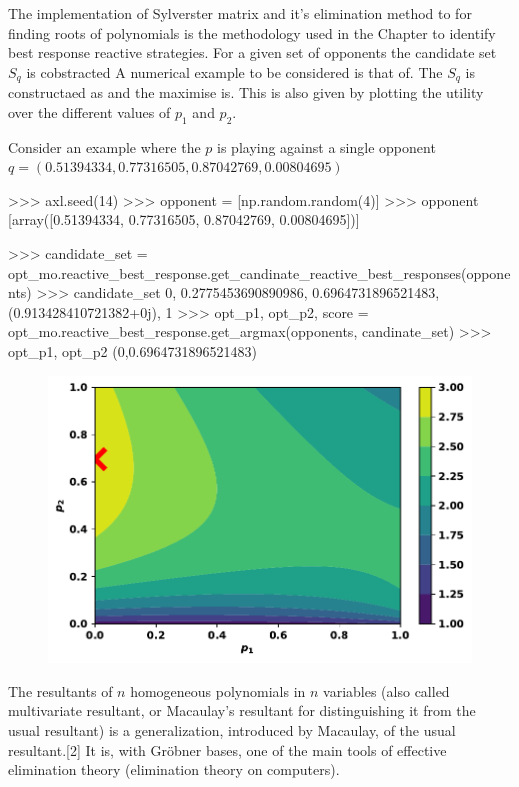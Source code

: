 The implementation of Sylverster matrix and it's elimination method to
for finding roots of polynomials is the methodology used in the Chapter
to identify best response reactive strategies. For a given set of opponents
the candidate set \(S_q\) is cobstracted 
A numerical example to be considered is that of. The \(S_q\) is constructaed
as and the maximise is. This is also given by plotting the utility over the
different values of \(p_1\) and \(p_2\).

Consider an example where the \(p\) is playing against a single opponent
\(q = (0.51394334, 0.77316505, 0.87042769, 0.00804695)\)

\begin{usagepy}
>>> axl.seed(14)
>>> opponent = [np.random.random(4)]
>>> opponent
[array([0.51394334, 0.77316505, 0.87042769, 0.00804695])]

>>> candidate_set = opt_mo.reactive_best_response.get_candinate_reactive_best_responses(opponents)
>>> candidate_set
{0, 0.2775453690890986, 0.6964731896521483, (0.913428410721382+0j), 1}
>>> opt_p1, opt_p2, score = opt_mo.reactive_best_response.get_argmax(opponents, candinate_set)
>>> opt_p1, opt_p2
(0,0.6964731896521483)
\end{usagepy}

\begin{figure}[!htbp]
    \centering
    \includegraphics[width=.4\linewidth]{src/chapters/05/reactive_best_response.pdf}
\end{figure}

The resultants  of \(n\) homogeneous polynomials in \(n\) variables (also called
multivariate resultant, or Macaulay's resultant for distinguishing it from the
usual resultant) is a generalization, introduced by Macaulay, of the usual
resultant.[2] It is, with Gröbner bases, one of the main tools of effective
elimination theory (elimination theory on computers).



